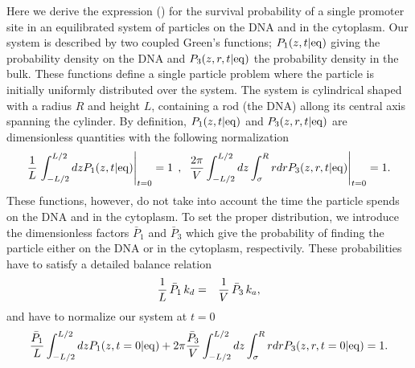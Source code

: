 Here we derive the expression () for the survival probability of a single promoter site in an equilibrated system of particles on the DNA and in the cytoplasm. Our system is described by two coupled Green's functions; $P_1(z,t|{\rm eq})$ giving the probability density on the DNA and $P_3(z,r,t|{\rm eq})$ the probability density in the bulk. These functions define a single particle problem where the particle is initially uniformly distributed over the system. The system is cylindrical shaped with a radius $R$ and height $L$, containing a rod (the DNA) allong its central axis spanning the cylinder. By definition, $P_1(z,t|{\rm eq})$ and $P_3(z,r,t|{\rm eq})$ are dimensionless quantities with the following normalization
\begin{equation}
 \frac{1}{L} \left. \int_{-L/2}^{L/2} dz P_1(z,t|{\rm eq})\right|_{t=0} = 1 \:\: , \:\: \left. \frac{2\pi}{V} \int_{-L/2}^{L/2} dz \int_{\sigma}^{R} rdr P_3(z,r,t|{\rm eq})\right|_{t=0} = 1.
\end{equation}
These functions, however, do not take into account the time the particle spends on the DNA and in the cytoplasm. To set the proper distribution, we introduce the dimensionless factors $\bar{P}_1$ and $\bar{P}_3$ which give the probability of finding the particle either on the DNA or in the cytoplasm, respectivily. These probabilities have to satisfy a detailed balance relation 
\begin{eqnarray}
 \frac{1}{L} \, \bar{P}_1 \, k_d & = & \frac{1}{V} \, \bar{P}_3 \, k_a,
 \elabel{DB_init}
\end{eqnarray}
and have to normalize our system at $t=0$
\begin{equation}
 \frac{\bar{P}_1}{L} \int_{-L/2}^{L/2} dz P_1(z,t=0|{\rm eq }) + 2\pi \frac{\bar{P}_3}{V} \int_{-L/2}^{L/2}dz \int_{\sigma}^{R}rdr P_3(z,r,t=0|{\rm eq}) = 1.
\end{equation}

